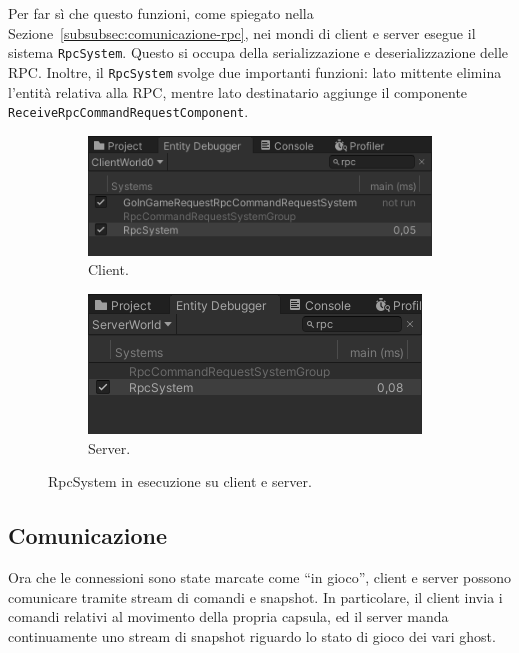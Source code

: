 Per far sì che questo funzioni, come spiegato nella Sezione~\ref{subsubsec:comunicazione-rpc}, nei mondi di client e server esegue il sistema \verb|RpcSystem|. Questo si occupa della serializzazione e deserializzazione delle RPC. Inoltre, il \verb|RpcSystem| svolge due importanti funzioni: lato mittente elimina l'entità relativa alla RPC, mentre lato destinatario aggiunge il componente \verb|ReceiveRpcCommandRequestComponent|.

\begin{figure}[!ht]
    \begin{subfigure}{.54\textwidth}
      \centering
      \includegraphics[width=.95\linewidth]{gfx/imgs/chapter4/RpcSystemClient.png}
      \caption{Client.}
      \label{fig:rpc-system-client}
    \end{subfigure}
    \begin{subfigure}{.45\textwidth}
      \centering
      \includegraphics[width=.95\linewidth]{gfx/imgs/chapter4/RpcSystemServer.png}
      \caption{Server.}
      \label{fig:rpc-system-server}
    \end{subfigure}
    \caption{RpcSystem in esecuzione su client e server.}
    \label{fig:rpc-system}
\end{figure}

\subsection{Comunicazione}
Ora che le connessioni sono state marcate come ``in gioco'', client e server possono comunicare tramite stream di comandi e snapshot. In particolare, il client invia i comandi relativi al movimento della propria capsula, ed il server manda continuamente uno stream di snapshot riguardo lo stato di gioco dei vari ghost.

